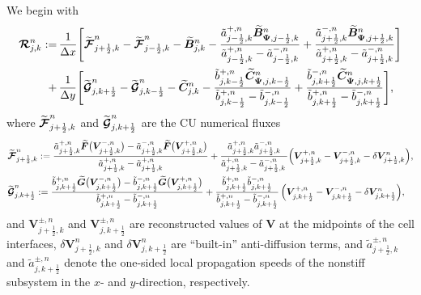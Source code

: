 \documentclass[A4paper,12pt,twoside]{article}
\numberwithin{equation}{section}
\numberwithin{figure}{section}
\numberwithin{table}{section}
\newcommand{\dx}{\Delta x}
\newcommand{\dy}{\Delta y}
\newcommand{\kph}{{k+\frac{1}{2}}}
\newcommand{\kmh}{{k-\frac{1}{2}}}
\newcommand{\jph}{{j+\frac{1}{2}}}
\newcommand{\jmh}{{j-\frac{1}{2}}}
\begin{document}
We begin with
\begin{equation}
\begin{aligned}
\bm{{\cal R}}_{j,k}^n:=&\,\frac{1}{\dx}\Bigg[\widetilde{\bm{{\cal F}}}_{\jph,k}^n-\widetilde{\bm{{\cal F}}}_{\jmh,k}^n-
\widetilde{\bm B}_{j,k}^n-\frac{\tilde a^{+,n}_{\jmh,k}\widetilde{\bm B}_{\bm\Psi,\jmh,k}^n}
{\tilde a^{+,n}_{\jmh,k}-\tilde a^{-,n}_{\jmh,k}}+
\frac{\tilde a^{-,n}_{\jph,k}\widetilde{\bm B}_{\bm\Psi,\jph,k}^n}{\tilde a^{+,n}_{\jph,k}-\tilde a^{-,n}_{\jph,k}}\Bigg]\\
+&\,\frac{1}{\dy}\Bigg[\widetilde{\bm{{\cal G}}}_{j,\kph}^n-\widetilde{\bm{{\cal G}}}_{j,\kmh}^n-\widetilde{\bm C}_{j,k}^n
-\frac{\tilde b^{+,n}_{j,\kmh}\widetilde{\bm C}_{\bm\Psi,j,\kmh}^n}{\tilde b^{+,n}_{j,\kmh}-\tilde b^{-,n}_{j,\kmh}}+
\frac{\tilde b^{-,n}_{j,\kph}\widetilde{\bm C}_{\bm\Psi,j,\kph}^n}{\tilde b^{+,n}_{j,\kph}-\tilde b^{-,n}_{j,\kph}}\Bigg],
\end{aligned}
\label{3.32}
\end{equation}
where $\widetilde{\bm{{\cal F}}}_{\jph,k}^n$ and $\widetilde{\bm{{\cal G}}}_{j,\kph}^n$ are the CU numerical fluxes
$$
\begin{aligned}
&\widetilde{\bm{{\cal F}}}_{\jph,k}^n:=\frac{\tilde a^{+,n}_{\jph,k}\widetilde{\bm F}\big(\bm V^{-,n}_{\jph,k}\big)-
\tilde a^{-,n}_{\jph,k}\widetilde{\bm F}\big(\bm V^{+,n}_{\jph,k}\big)}{\tilde a^{+,n}_{\jph,k}-\tilde a^{+,n}_{\jph,k}}+
\frac{\tilde a^{+,n}_{\jph,k}\tilde a^{-,n}_{\jph,k}}{\tilde a^{+,n}_{\jph,k}-\tilde a^{-,n}_{\jph,k}\,}
\Big(\bm V^{+,n}_{\jph,k}-\bm V^{-,n}_{\jph,k}-\delta\bm V_{\jph,k}^n\Big),\\
&\widetilde{\bm{{\cal G}}}_{j,\kph}^n:=\frac{\tilde b^{+,n}_{j,\kph}\widetilde{\bm G}\big(\bm V^{-,n}_{j,\kph}\big)-
\tilde b^{-,n}_{j,\kph}\widetilde{\bm G}\big(\bm V^{+,n}_{j,\kph}\big)}{\tilde b^{+,n}_{j,\kph}-\tilde b^{-,n}_{j,\kph}}+
\frac{\tilde b^{+,n}_{j,\kph}\tilde b^{-,n}_{j,\kph}}{\tilde b^{+,n}_{j,\kph}-\tilde b^{-,n}_{j,\kph}}\,
\Big(\bm V^{+,n}_{j,\kph}-\bm V^{-,n}_{j,\kph}-\delta\bm V_{j,\kph}^n\Big),
\end{aligned}
$$
and $\bm V^{\pm,n}_{\jph,k}$ and $\bm V^{\pm,n}_{j,\kph}$ are reconstructed values of $\bm V$ at the midpoints of the cell interfaces,
$\delta\bm V_{\jph,k}^n$ and $\delta\bm V_{j,\kph}^n$ are ``built-in'' anti-diffusion terms, and $\tilde a^{\pm,n}_{\jph,k}$ and
$\tilde a^{\pm,n}_{j,\kph}$ denote the one-sided local propagation speeds of the nonstiff subsystem in the $x$- and $y$-direction,
respectively.
\end{document}
